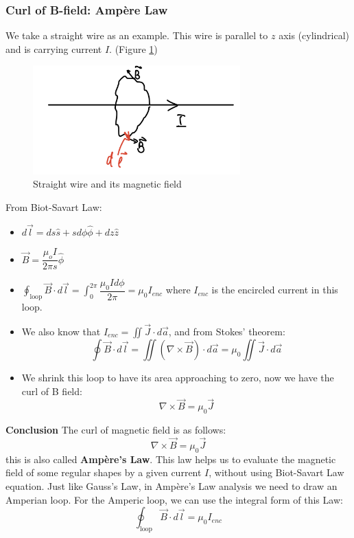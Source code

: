 \documentclass[12pt,a4paper,twoside]{article}
\numberwithin{equation}{section}
\begin{document}
\subsubsection{Curl of B-field: Amp\`ere Law}
We take a straight wire as an example. This wire is parallel to $z$ axis (cylindrical) and is carrying current $I$. (Figure \ref{fig: curl-B})\\

\begin{figure}[h]
    \centering
    \includegraphics[width=8cm]{250-Revision/curl-b.PNG}
    \caption{Straight wire and its magnetic field}
    \label{fig: curl-B}
\end{figure}

\noindent From Biot-Savart Law:
\begin{itemize}
    \item $d\overrightarrow{l}=ds\hat{s}+sd\phi\hat{\phi}+dz\hat{z}$
    \item $\overrightarrow{B}=\dfrac{\mu_oI}{2\pi s}\hat{\phi}$
    \item $\oint_{\mathrm{loop}}\overrightarrow{B}\cdot d\overrightarrow{l}=\int_{0}^{2\pi}\dfrac{\mu_0Id\phi}{2\pi}=\mu_0I_{enc}$
    where $I_{enc}$ is the encircled current in this loop.
    \item We also know that $I_{enc}=\iint \overrightarrow{J}\cdot d\overrightarrow{a}$, and from Stokes' theorem:
    \[\oint\overrightarrow{B}\cdot d\overrightarrow{l}=\iint(\nabla \times \overrightarrow{B})\cdot d\overrightarrow{a}=\mu_0\iint \overrightarrow{J}\cdot d\overrightarrow{a}\]
    \item We shrink this loop to have its area approaching to zero, now we have the curl of B field:
    \[\nabla\times \overrightarrow{B}=\mu_0\overrightarrow{J}\]
\end{itemize}

\noindent\textbf{Conclusion} The curl of magnetic field is as follows:
\begin{equation}
    \boxed{
    \nabla\times \overrightarrow{B}=\mu_0\overrightarrow{J}
    }
    \label{eq: Ampere-law}
\end{equation}
this is also called \textbf{Amp\`ere's Law}. This law helps us to evaluate the magnetic field of some regular shapes by a given current $I$, without using Biot-Savart Law equation. Just like Gauss's Law, in Amp\`ere's Law analysis we need to draw an Amperian loop. For the Amperic loop, we can use the integral form of this Law:
\begin{equation}
    \boxed{
    \oint_{\mathrm{loop}}\overrightarrow{B}\cdot d\overrightarrow{l}=\mu_0I_{enc}
    }
    \label{eq: Ampere-law-integral}
\end{equation}
\end{document}
